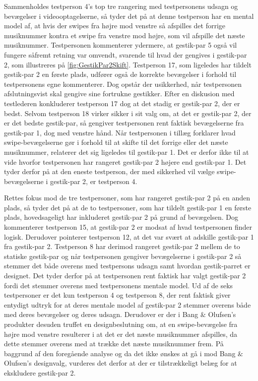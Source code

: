 \noindent
%
Sammenholdes testperson 4's top tre rangering med testpersonens udsagn og bevægelser i videooptagelserne, så tyder det på at denne testperson har en mental model af, at hvis der swipes fra højre mod venstre så afspilles det forrige musiknummer kontra et swipe fra venstre mod højre, som vil afspille det næste musiknummer. Testpersonen kommenterer ydermere, at gestik-par 5 også vil fungere såfremt retning var omvendt, svarende til hvad der gengives i gestik-par 2, som illustreres på \autoref{fig:GestikPar2Skift}. Testperson 17, som ligeledes har tildelt gestik-par 2 en første plads, udfører også de korrekte bevægelser i forhold til testpersonens egne kommenterer. Dog opstår der usikkerhed, når testpersonen afslutningsvist skal gengive sine fortrukne gestikker. Efter en diskusion med testlederen konkluderer testperson 17 dog at det stadig er gestik-par 2, der er bedst. Selvom testperson 18 virker sikker i sit valg om, at det er gestik-par 2, der er det bedste gestik-par, så gengiver testpersonen rent faktisk bevægelserne fra gestik-par 1, dog med venstre hånd. Når testpersonen i tillæg forklarer hvad swipe-bevægelserne gør i forhold til at skifte til det forrige eller det næste musiknummer, relaterer det sig ligeledes til gestik-par 1. Det er derfor ikke til at vide hvorfor testpersonen har rangeret gestik-par 2 højere end gestik-par 1. Det tyder derfor på at den eneste testperson, der med sikkerhed vil vælge swipe-bevægelserne i gestik-par 2, er testperson 4. 

Rettes fokus mod de tre testpersoner, som har rangeret gestik-par 2 på en anden plads, så tyder det på at de to testpersoner, som har tildelt gestik-par 1 en første plads, hovedsageligt har inkluderet gestik-par 2 på grund af bevægelsen. Dog kommenterer testperson 15, at gestik-par 2 er modsat af hvad testpersonen finder logisk. Derudover pointerer testperson 12, at det var svært at adskille gestik-par 1 fra gestik-par 2. Testperson 8 har derimod rangeret gestik-par 2 mellem de to statiske gestik-par og når testpersonen gengiver bevægelserne i gestik-par 2 så stemmer det både overens med testpersons udsagn samt hvordan gestik-parret er designet. Det tyder derfor på at testpersonen rent faktisk har valgt gestik-par 2 fordi det stemmer overens med testpersonens mentale model.\blankline 
%
Ud af de seks testpersoner er det kun testperson 4 og testperson 8, der rent faktisk giver entydigt udtryk for at deres mentale model af gestik-par 2 stemmer overens både med deres bevægelser og deres udsagn. Derudover er der i Bang $\&$ Olufsen's produkter desuden truffet en designbeslutning om, at en swipe-bevægelse fra højre mod venstre resulterer i at det er det næste musiknummer afspilles, da dette stemmer overens med at trække det næste musiknummer frem. På baggrund af den foregående analyse og da det ikke ønskes at gå i mod Bang $\&$ Olufsen's designvalg, vurderes det derfor at der er tilstrækkeligt belæg for at ekskludere gestik-par 2. 

